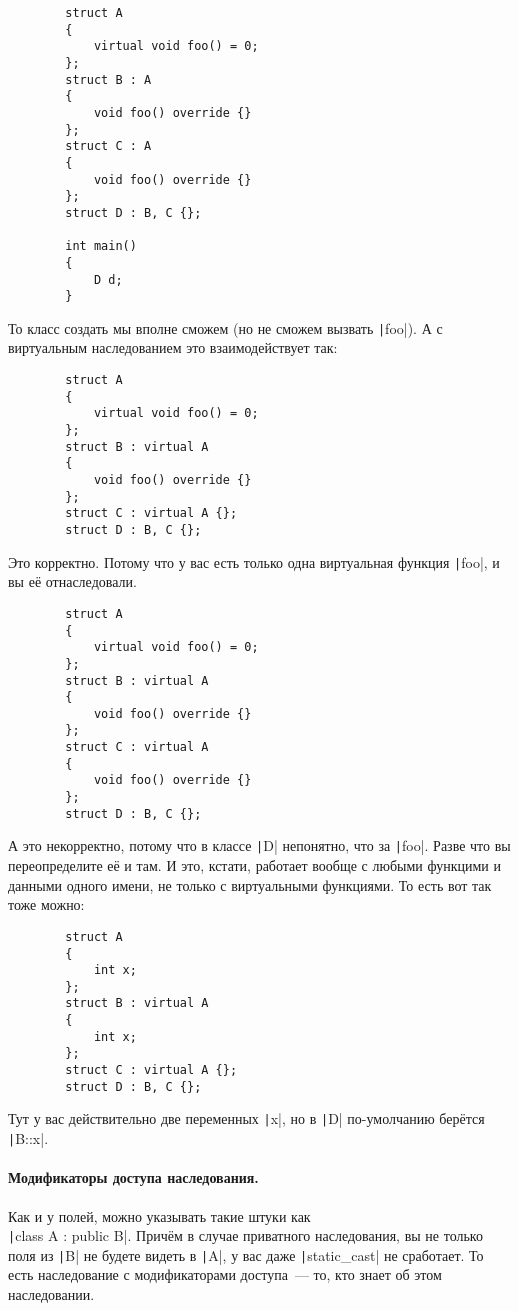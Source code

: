 \documentclass{article}
\begin{document}
    \begin{verbatim}
        struct A
        {
            virtual void foo() = 0;
        };
        struct B : A
        {
            void foo() override {}
        };
        struct C : A
        {
            void foo() override {}
        };
        struct D : B, C {};
        
        int main()
        {
            D d;
        }
    \end{verbatim}
    То класс создать мы вполне сможем (но не сможем вызвать \texttt|foo|). А с виртуальным наследованием это взаимодействует так:
    \begin{verbatim}
        struct A
        {
            virtual void foo() = 0;
        };
        struct B : virtual A
        {
            void foo() override {}
        };
        struct C : virtual A {};
        struct D : B, C {};
    \end{verbatim}
    Это корректно. Потому что у вас есть только одна виртуальная функция \texttt|foo|, и вы её отнаследовали.
    \begin{verbatim}
        struct A
        {
            virtual void foo() = 0;
        };
        struct B : virtual A
        {
            void foo() override {}
        };
        struct C : virtual A
        {
            void foo() override {}
        };
        struct D : B, C {};
    \end{verbatim}
    А это некорректно, потому что в классе \texttt|D| непонятно, что за \texttt|foo|. Разве что вы переопределите её и там. И это, кстати, работает вообще с любыми функцими и данными одного имени, не только с виртуальными функциями. То есть вот так тоже можно:
    \begin{verbatim}
        struct A
        {
            int x;
        };
        struct B : virtual A
        {
            int x;
        };
        struct C : virtual A {};
        struct D : B, C {};
    \end{verbatim}
    Тут у вас действительно две переменных \texttt|x|, но в \texttt|D| по-умолчанию берётся \texttt|B::x|.
    \paragraph{Модификаторы доступа наследования.}
    Как и у полей, можно указывать такие штуки как\\\texttt|class A : public B|. Причём в случае приватного наследования, вы не только поля из \texttt|B| не будете видеть в \texttt|A|, у вас даже \texttt|static_cast| не сработает. То есть наследование с модификаторами доступа~--- то, кто знает об этом наследовании.
\end{document}
